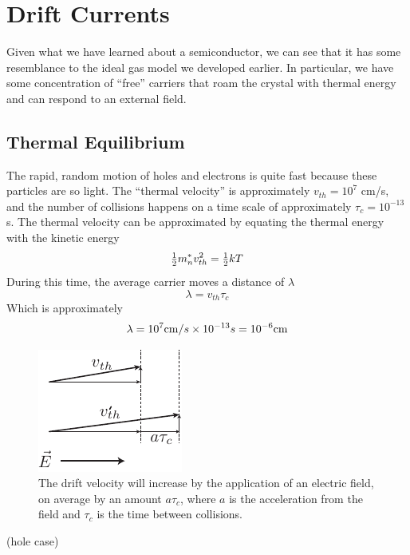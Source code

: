 \section{Drift Currents}
Given what we have learned about a semiconductor, we can see that it has some resemblance to the ideal gas model we developed earlier.  In particular, we have some concentration of “free” carriers that roam the crystal with thermal energy and can respond to an external field.  
\subsection{Thermal Equilibrium}
The rapid, random motion of holes and electrons is quite fast because these particles are so light.  The “thermal velocity” is approximately $v_{th} = 10^7$ cm/s, and the number of collisions happens on a time scale of approximately $\tau_c = 10^{-13}$s.  The thermal velocity can be approximated by equating the thermal energy with the kinetic energy
\begin{equation}
    {\textstyle{1 \over 2}}m_n^*v_{th}^2 = {\textstyle{1 \over 2}}kT
\end{equation}
During this time, the average carrier moves a distance of $\lambda$
\begin{equation} \lambda  = {v_{th}}{\tau _c}\end{equation}
Which is approximately
\begin{equation}
        \lambda  = {10^7}{\rm{cm}}/s \times {10^{ - 13}}s = {10^{ - 6}}{\rm{cm}}
\end{equation}
\begin{figure}[tb]
\begin{center}
\includegraphics[width=.3\columnwidth]{drift_field}
\end{center}
\caption{The drift velocity will increase by the application of an electric field, on average by an amount $a \tau_c$, where $a$ is the acceleration from the field and $\tau_c$ is the time between collisions. }
\label{fig:drift_field}
\end{figure}
(hole case)

